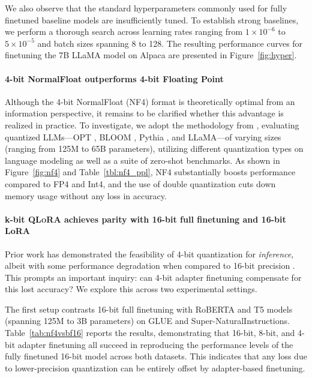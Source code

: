 We also observe that the standard hyperparameters commonly used for fully finetuned baseline models are insufficiently tuned. To establish strong baselines, we perform a thorough search across learning rates ranging from $1\times 10^{-6}$ to $5\times 10^{-5}$ and batch sizes spanning 8 to 128. The resulting performance curves for finetuning the 7B LLaMA model on Alpaca are presented in Figure~\ref{fig:hyper}.

\paragraph{4-bit NormalFloat outperforms 4-bit Floating Point}

Although the 4-bit NormalFloat (NF4) format is theoretically optimal from an information perspective, it remains to be clarified whether this advantage is realized in practice. To investigate, we adopt the methodology from \citet{dettmers2022case}, evaluating quantized LLMs—OPT \citep{zhang2022opt}, BLOOM \cite{scao2022bloom}, Pythia \cite{biderman2023pythia}, and LLaMA—of varying sizes (ranging from 125M to 65B parameters), utilizing different quantization types on language modeling as well as a suite of zero-shot benchmarks. As shown in Figure~\ref{fig:nf4} and Table~\ref{tbl:nf4_ppl}, NF4 substantially boosts performance compared to FP4 and Int4, and the use of double quantization cuts down memory usage without any loss in accuracy.

\paragraph{k-bit \textsc{QLoRA} achieves parity with 16-bit full finetuning and 16-bit LoRA}

Prior work has demonstrated the feasibility of 4-bit quantization for \emph{inference}, albeit with some performance degradation when compared to 16-bit precision \citep{dettmers2022case,frantar2022gptq}. This prompts an important inquiry: can 4-bit adapter finetuning compensate for this lost accuracy? We explore this across two experimental settings.

The first setup contrasts 16-bit full finetuning with RoBERTA and T5 models (spanning 125M to 3B parameters) on GLUE and Super-NaturalInstructions. Table~\ref{tab:nf4vsbf16} reports the results, demonstrating that 16-bit, 8-bit, and 4-bit adapter finetuning all succeed in reproducing the performance levels of the fully finetuned 16-bit model across both datasets. This indicates that any loss due to lower-precision quantization can be entirely offset by adapter-based finetuning.

